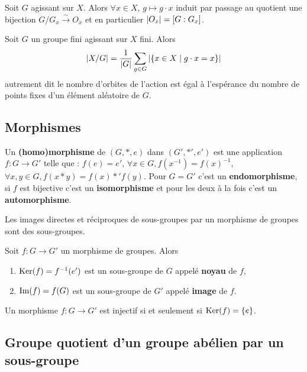 	\begin{pop}
		Soit $G$ agissant sur $X$.
		Alors $\forall x \in X$, $g \mapsto g \cdot x$ induit par passage au quotient une bijection $G/G_x \overset{\sim}{\to} O_x$ et en particulier $\left\lvert O_x\right\rvert = [G : G_x]$.
	\end{pop}

	\begin{thm}
		Soit $G$ un groupe fini agissant sur $X$ fini.
		Alors
		$$\left\lvert X/G\right\rvert = \frac{1}{\left\lvert G\right\rvert} \sum_{g \in G} \left\lvert\{ x \in X \mid g \cdot x = x \} \right\rvert$$
		autrement dit le nombre d'orbites de l'action est égal à l'espérance du nombre de points fixes d'un élément aléatoire de $G$.
	\end{thm}


\subsection{Morphismes}

	\begin{defn}
		Un \textbf{(homo)morphisme} de $(G,*,e)$ dans $(G',*',e')$ est une application $f \colon G \to G'$ telle que : $f(e) = e'$, $\forall x \in G, f(x^{-1}) = f(x)^{-1}$, $\forall x,y \in G, f(x * y) = f(x) *' f(y)$.
		Pour $G = G'$ c'est un \textbf{endomorphisme}, si $f$ est bijective c'est un \textbf{isomorphisme} et pour les deux à la fois c'est un \textbf{automorphisme}.
	\end{defn}

	\begin{pop}
		Les images directes et réciproques de sous-groupes par un morphisme de groupes sont des sous-groupes.
	\end{pop}

	\begin{defn}
		Soit $f \colon G \to G'$ un morphisme de groupes.
		Alors
		\begin{enumerate}
			\item $\operatorname{Ker}(f) = f^{-1}(e')$ est un sous-groupe de $G$ appelé \textbf{noyau} de $f$,
			\item $\operatorname{Im}(f) = f(G)$ est un sous-groupe de $G'$ appelé \textbf{image} de $f$.
		\end{enumerate}
	\end{defn}

	\begin{pop}
		Un morphisme $f \colon G \to G'$ est injectif si et seulement si $\operatorname{Ker}(f) = \{ e \}$.
	\end{pop}


\subsection{Groupe quotient d'un groupe abélien par un sous-groupe}

